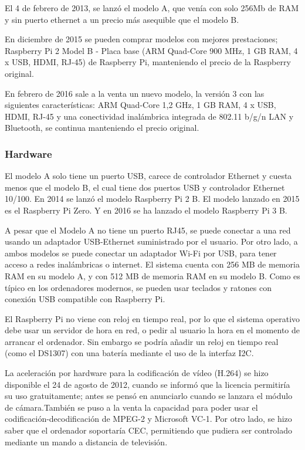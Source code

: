 \documentclass[a4paper,11pt,oneside]{book}
\begin{document}
El 4 de febrero de 2013, se lanzó el modelo A, que venía con solo 256Mb de RAM y sin puerto ethernet a un precio más asequible que el modelo B.

En diciembre de 2015 se pueden comprar modelos con mejores prestaciones; Raspberry Pi 2 Model B - Placa base (ARM Quad-Core 900 MHz, 1 GB RAM, 4 x USB, HDMI, RJ-45) de Raspberry Pi, manteniendo el precio de la Raspberry original.


En febrero de 2016 sale a la venta un nuevo modelo, la versión 3 con las siguientes características: ARM Quad-Core 1,2 GHz, 1 GB RAM, 4 x USB, HDMI, RJ-45 y una conectividad inalámbrica integrada de 802.11 b/g/n LAN y Bluetooth, se continua manteniendo el precio original.

\subsubsection{Hardware}
El modelo A solo tiene un puerto USB, carece de controlador Ethernet y cuesta menos que el modelo B, el cual tiene dos puertos USB y controlador Ethernet 10/100. En 2014 se lanzó el modelo Raspberry Pi 2 B. El modelo lanzado en 2015 es el Raspberry Pi Zero. Y en 2016 se ha lanzado el modelo Raspberry Pi 3 B.


A pesar que el Modelo A no tiene un puerto RJ45, se puede conectar a una red usando un adaptador USB-Ethernet suministrado por el usuario. Por otro lado, a ambos modelos se puede conectar un adaptador Wi-Fi por USB, para tener acceso a redes inalámbricas o internet. El sistema cuenta con 256 MB de memoria RAM en su modelo A, y con 512 MB de memoria RAM en su modelo B. Como es típico en los ordenadores modernos, se pueden usar teclados y ratones con conexión USB compatible con Raspberry Pi.

El Raspberry Pi no viene con reloj en tiempo real, por lo que el sistema operativo debe usar un servidor de hora en red, o pedir al usuario la hora en el momento de arrancar el ordenador. Sin embargo se podría añadir un reloj en tiempo real (como el DS1307) con una batería mediante el uso de la interfaz I2C.


La aceleración por hardware para la codificación de vídeo (H.264) se hizo disponible el 24 de agosto de 2012, cuando se informó que la licencia permitiría su uso gratuitamente; antes se pensó en anunciarlo cuando se lanzara el módulo de cámara.También se puso a la venta la capacidad para poder usar el codificación-decodificación de MPEG-2 y Microsoft VC-1. Por otro lado, se hizo saber que el ordenador soportaría CEC, permitiendo que pudiera ser controlado mediante un mando a distancia de televisión.
\end{document}
